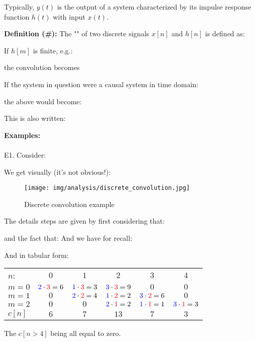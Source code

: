 	Typically, $y(t)$ is the output of a system characterized by its impulse response function $h(t)$ with input $x(t)$.
	
	\textbf{Definition (\#\mydef):} The "" of two discrete signals $x[n]$ and $h[n]$ is defined as:
	
	If $h[m]$ is finite, e.g.:
	
	the convolution becomes
	
	If the system in question were a causal system in time domain:
	
	the above would become:
	
	This is also written:
	
	\begin{tcolorbox}[colframe=black,colback=white,sharp corners]
	\textbf{{\Large {}}Examples:}\\\\
	E1. Consider:
	
	We get visually (it's not obvious!):
	\begin{figure}[H]
		\centering
		\texttt{[image: img/analysis/discrete\_convolution.jpg]}
		\caption{Discrete convolution example}
	\end{figure}
	The details steps are given by first considering that:
	
	and the fact that:
	And we have for recall:
	
	And in tabular form:
	\begin{table}[H]
	\centering
		\begin{tabular}{lccccc}
		$n$: & $0$ & $1$ & $2$ & $3$ & $4$ \\
		$m=0$ & ${\color{blue}{2}}\cdot {\color{red}{3}}=6$ & ${\color{blue}{1}}\cdot {\color{red}{3}}=3$ & ${\color{blue}{3}}\cdot {\color{red}{3}}=9$ & $0$ & $0$ \\
		$m=1$ & $0$ & ${\color{blue}{2}}\cdot {\color{red}{2}}=4$ & ${\color{blue}{1}}\cdot {\color{red}{2}}=2$ & ${\color{blue}{3}}\cdot {\color{red}{2}}=6$ & $0$ \\
		$m=2$ & $0$ & $0$ & ${\color{blue}{2}}\cdot {\color{red}{1}}=2$ & ${\color{blue}{1}}\cdot {\color{red}{1}}=1$ & ${\color{blue}{3}}\cdot {\color{red}{1}}=3$ \\ \hhline{|=|=|=|=|=|=|}
		$c[n]$ & $6$ & $7$ & $13$ & $7$ & $3$
		\end{tabular}
	\end{table}
	The $c[n>4]$ being all equal to zero.\\
	\end{tcolorbox}
